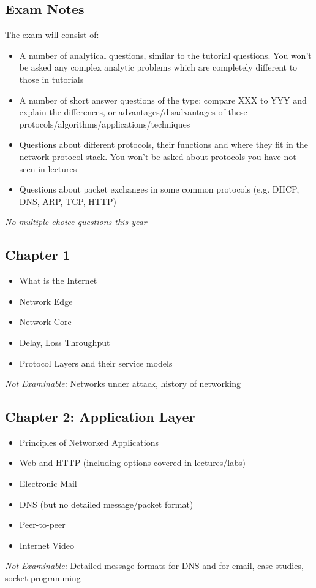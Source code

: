\documentclass[12pt, a4paper]{article}
\begin{document}
\newpage
\begin{multicols*}{2}
	
	\section{Exam Notes}
	The exam will consist of:
	\begin{itemize}
		\item A number of analytical questions, similar to the tutorial questions. You won't be asked any complex analytic problems which are completely different to those in tutorials
		\item A number of short answer questions of the type: compare XXX to YYY and explain the differences, or advantages/disadvantages of these protocols/algorithms/applications/techniques
		\item Questions about different protocols, their functions and where they fit in the network protocol stack. You won't be asked about protocols you have not seen in lectures
		\item Questions about packet exchanges in some common protocols (e.g. DHCP, DNS, ARP, TCP, HTTP)
	\end{itemize}
	\textit{No multiple choice questions this year \Sadey[][yellow!70] }
	\subsection{Chapter 1}
	\begin{itemize}
		\item What is the Internet
		\item Network Edge
		\item Network Core
		\item Delay, Loss Throughput
		\item Protocol Layers and their service models
	\end{itemize}
	\textit{Not Examinable:} Networks under attack, history of networking
	\subsection{Chapter 2: Application Layer}
	\begin{itemize}
		\item Principles of Networked Applications
		\item Web and HTTP (including options covered in lectures/labs)
		\item Electronic Mail
		\item DNS (but no detailed message/packet format)
		\item Peer-to-peer
		\item Internet Video
	\end{itemize}
	\textit{Not Examinable:} Detailed message formats for DNS and for email, case studies, socket programming

\end{multicols*}
\end{document}
